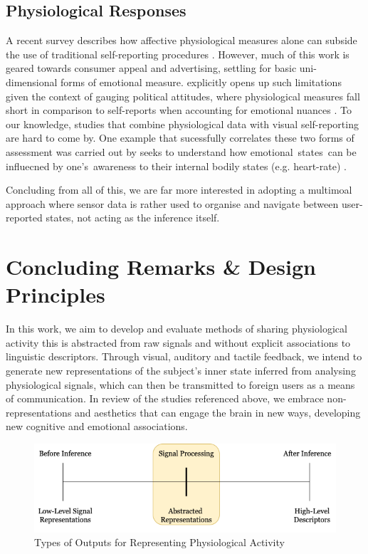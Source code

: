 \subsection{Physiological Responses}
A recent survey describes how affective physiological measures alone can subside the use of traditional self-reporting procedures \cite{barker_self-report_2016}. However, much of this work is geared towards consumer appeal and advertising, settling for basic uni-dimensional forms of emotional measure. \citeauthor{ciuk_measuring_2015} explicitly opens up such limitations given the context of gauging political attitudes, where physiological measures fall short in comparison to self-reports when accounting for emotional nuances \cite{ciuk_measuring_2015}. To our knowledge, studies that combine physiological data with visual self-reporting are hard to come by. One example that sucessfully correlates these two forms of assessment was carried out by \citeauthor{} seeks to understand how emotional states can be influecned by one's awareness to their internal bodily states (e.g. heart-rate) \cite{}.

Concluding from all of this, we are far more interested in adopting a multimoal approach where sensor data is rather used to organise and navigate between user-reported states, not acting as the inference itself.


\section{Concluding Remarks \& Design Principles}
\label{lit_review:conclusion}

In this work, we aim to develop and evaluate methods of sharing physiological activity this is abstracted from raw signals and without explicit associations to linguistic descriptors. Through visual, auditory and tactile feedback, we intend to generate new representations of the subject's inner state inferred from analysing physiological signals, which can then be transmitted to foreign users as a means of communication. In review of the studies referenced above, we embrace non-representations and aesthetics that can engage the brain in new ways, developing new cognitive and emotional associations.

\begin{figure}[htbp]
	\centering
	\includegraphics[width=1.0\textwidth]{Chapters/Figures/Abstracted_Representations.png}
	\caption{Types of Outputs for Representing Physiological Activity}
	\label{fig:Abstracted_Representations}
\end{figure}

